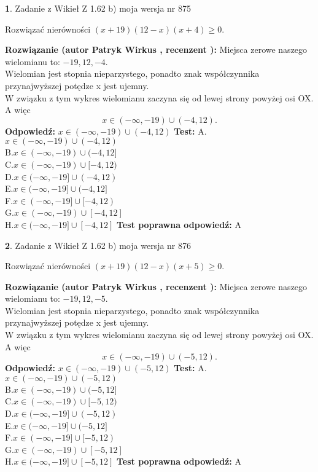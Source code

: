 \documentclass[12pt, a4paper]{article}
\theoremstyle{definition} %
\newtheorem{zad}{}
\newcommand{\zadStart}[1]{\begin{zad}#1\newline}
\newcommand{\zadStop}{\end{zad}}
\newcommand{\rozwStart}[2]{\noindent \textbf{Rozwiązanie (autor #1 , recenzent #2): }\newline}
\newcommand{\rozwStop}{\newline}
\newcommand{\odpStart}{\noindent \textbf{Odpowiedź:}\newline}
\newcommand{\odpStop}{\newline}
\newcommand{\testStart}{\noindent \textbf{Test:}\newline}
\newcommand{\testStop}{\newline}
\newcommand{\kluczStart}{\noindent \textbf{Test poprawna odpowiedź:}\newline}
\newcommand{\kluczStop}{\newline}
\begin{document}
\zadStart{Zadanie z Wikieł Z 1.62 b) moja wersja nr 875}

Rozwiązać nierówności $(x+19)(12-x)(x+4)\ge0$.
\zadStop
\rozwStart{Patryk Wirkus}{}
Miejsca zerowe naszego wielomianu to: $-19, 12, -4$.\\
Wielomian jest stopnia nieparzystego, ponadto znak współczynnika przy\linebreak najwyższej potędze x jest ujemny.\\ W związku z tym wykres wielomianu zaczyna się od lewej strony powyżej osi OX. A więc $$x \in (-\infty,-19) \cup (-4,12).$$
\rozwStop
\odpStart
$x \in (-\infty,-19) \cup (-4,12)$
\odpStop
\testStart
A.$x \in (-\infty,-19) \cup (-4,12)$\\
B.$x \in (-\infty,-19) \cup (-4,12]$\\
C.$x \in (-\infty,-19) \cup [-4,12)$\\
D.$x \in (-\infty,-19] \cup (-4,12)$\\
E.$x \in (-\infty,-19] \cup (-4,12]$\\
F.$x \in (-\infty,-19] \cup [-4,12)$\\
G.$x \in (-\infty,-19) \cup [-4,12]$\\
H.$x \in (-\infty,-19] \cup [-4,12]$
\testStop
\kluczStart
A
\kluczStop



\zadStart{Zadanie z Wikieł Z 1.62 b) moja wersja nr 876}

Rozwiązać nierówności $(x+19)(12-x)(x+5)\ge0$.
\zadStop
\rozwStart{Patryk Wirkus}{}
Miejsca zerowe naszego wielomianu to: $-19, 12, -5$.\\
Wielomian jest stopnia nieparzystego, ponadto znak współczynnika przy\linebreak najwyższej potędze x jest ujemny.\\ W związku z tym wykres wielomianu zaczyna się od lewej strony powyżej osi OX. A więc $$x \in (-\infty,-19) \cup (-5,12).$$
\rozwStop
\odpStart
$x \in (-\infty,-19) \cup (-5,12)$
\odpStop
\testStart
A.$x \in (-\infty,-19) \cup (-5,12)$\\
B.$x \in (-\infty,-19) \cup (-5,12]$\\
C.$x \in (-\infty,-19) \cup [-5,12)$\\
D.$x \in (-\infty,-19] \cup (-5,12)$\\
E.$x \in (-\infty,-19] \cup (-5,12]$\\
F.$x \in (-\infty,-19] \cup [-5,12)$\\
G.$x \in (-\infty,-19) \cup [-5,12]$\\
H.$x \in (-\infty,-19] \cup [-5,12]$
\testStop
\kluczStart
A
\kluczStop
\end{document}
